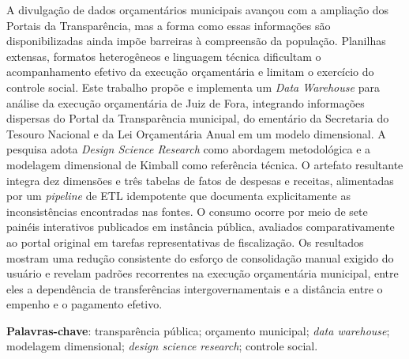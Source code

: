 \documentclass[a4paper,12pt]{monografia}
\theoremstyle{plain}
\theoremstyle{definition}
\theoremstyle{remark}
\begin{document}



A divulgação de dados orçamentários municipais avançou com a ampliação dos Portais da Transparência, mas a forma como essas informações são disponibilizadas ainda impõe barreiras à compreensão da população. Planilhas extensas, formatos heterogêneos e linguagem técnica dificultam o acompanhamento efetivo da execução orçamentária e limitam o exercício do controle social. Este trabalho propõe e implementa um \textit{Data Warehouse} para análise da execução orçamentária de Juiz de Fora, integrando informações dispersas do Portal da Transparência municipal, do ementário da Secretaria do Tesouro Nacional e da Lei Orçamentária Anual em um modelo dimensional. A pesquisa adota \textit{Design Science Research} como abordagem metodológica e a modelagem dimensional de Kimball como referência técnica. O artefato resultante integra dez dimensões e três tabelas de fatos de despesas e receitas, alimentadas por um \textit{pipeline} de ETL idempotente que documenta explicitamente as inconsistências encontradas nas fontes. O consumo ocorre por meio de sete painéis interativos publicados em instância pública, avaliados comparativamente ao portal original em tarefas representativas de fiscalização. Os resultados mostram uma redução consistente do esforço de consolidação manual exigido do usuário e revelam padrões recorrentes na execução orçamentária municipal, entre eles a dependência de transferências intergovernamentais e a distância entre o empenho e o pagamento efetivo.

\vspace{0.3cm}
\noindent\textbf{Palavras-chave}: transparência pública; orçamento municipal; \textit{data warehouse}; modelagem dimensional; \textit{design science  research}; controle social.
\end{document}
